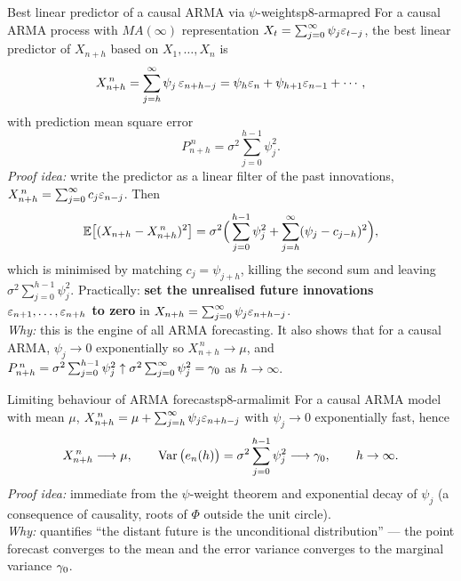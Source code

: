 \begin{theorem}{Best linear predictor of a causal ARMA via $\psi$-weights}{p8-armapred}
For a causal ARMA process with $MA(\infty)$ representation
$X_t=\sum_{j=0}^\infty\psi_j\varepsilon_{t-j}$, the best linear predictor of $X_{n+h}$
based on $X_1,\dots,X_n$ is
\[
X^{\,n}_{n+h}=\sum_{j=h}^{\infty}\psi_j\,\varepsilon_{n+h-j}
=\psi_h\varepsilon_n+\psi_{h+1}\varepsilon_{n-1}+\cdots,
\]
with prediction mean square error
\[
P^{\,n}_{n+h}=\sigma^2\sum_{j=0}^{h-1}\psi_j^2 .
\]
\textit{Proof idea:} write the predictor as a linear filter of the past
innovations, $X^{\,n}_{n+h}=\sum_{j=0}^\infty c_j\varepsilon_{n-j}$. Then
\[
\mathbb{E}\big[(X_{n+h}-X^{\,n}_{n+h})^2\big]
=\sigma^2\Big(\sum_{j=0}^{h-1}\psi_j^2+\sum_{j=h}^\infty(\psi_j-c_{j-h})^2\Big),
\]
which is minimised by matching $c_{j}=\psi_{j+h}$, killing the second sum and
leaving $\sigma^2\sum_{j=0}^{h-1}\psi_j^2$. Practically:
\textbf{set the unrealised future innovations $\varepsilon_{n+1},\dots,\varepsilon_{n+h}$ to
zero} in $X_{n+h}=\sum_{j=0}^\infty\psi_j\varepsilon_{n+h-j}$.\\[2pt]
\textit{Why:} this is the engine of all ARMA forecasting. It also shows that for
a causal ARMA, $\psi_j\to0$ exponentially so $X^{\,n}_{n+h}\to\mu$, and
$P^{\,n}_{n+h}=\sigma^2\sum_{j=0}^{h-1}\psi_j^2\uparrow\sigma^2\sum_{j=0}^\infty\psi_j^2=\gamma_0$
as $h\to\infty$.
\end{theorem}

\begin{proposition}{Limiting behaviour of ARMA forecasts}{p8-armalimit}
For a causal ARMA model with mean $\mu$,
$X^{\,n}_{n+h}=\mu+\sum_{j=h}^\infty\psi_j\varepsilon_{n+h-j}$ with $\psi_j\to0$
exponentially fast, hence
\[
X^{\,n}_{n+h}\longrightarrow\mu,
\qquad
\operatorname{Var}\big(e_n(h)\big)=\sigma^2\sum_{j=0}^{h-1}\psi_j^2\longrightarrow\gamma_0,
\qquad h\to\infty .
\]
\textit{Proof idea:} immediate from the $\psi$-weight theorem and exponential
decay of $\psi_j$ (a consequence of causality, roots of $\Phi$ outside the unit
circle).\\[2pt]
\textit{Why:} quantifies ``the distant future is the unconditional
distribution'' --- the point forecast converges to the mean and the error
variance converges to the marginal variance $\gamma_0$.
\end{proposition}


